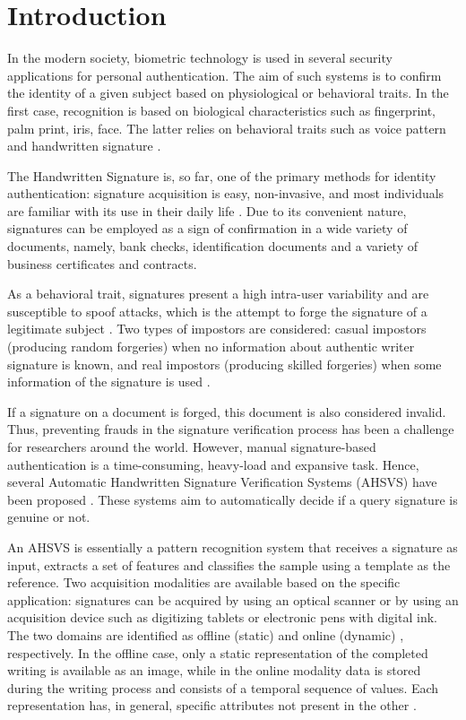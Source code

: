 
\chapter{Introduction}

In the modern society, biometric technology is used in several security applications for personal authentication. The aim of such systems is to confirm the identity of a given subject based on physiological or behavioral traits. In the first case, recognition is based on biological characteristics such as fingerprint, palm print, iris, face. The latter relies on behavioral traits such as voice pattern and handwritten signature \cite{jain2004biometrics}.

The Handwritten Signature is, so far, one of the primary methods for identity authentication: signature acquisition is easy, non-invasive, and most individuals are familiar with its use in their daily life \cite{impedovo2008state}. Due to its convenient nature, signatures can be employed as a sign of confirmation in a wide variety of documents, namely, bank checks, identification documents and a variety of business certificates and contracts.

As a behavioral trait, signatures present a high intra-user variability and are susceptible to spoof attacks, which is the attempt to forge the signature of a legitimate subject \cite{jain2004biometrics}. Two types of impostors are considered: casual impostors (producing random forgeries) when no information about authentic writer signature is known, and real impostors (producing skilled forgeries) when some information of the signature is used \cite{fierrez2008handbook}.


If a signature on a document is forged, this document is also considered invalid. Thus, preventing frauds in the signature verification process has been a challenge for researchers around the world. However, manual signature-based authentication is a time-consuming, heavy-load and expansive task. Hence, several Automatic Handwritten Signature Verification Systems (AHSVS) have been proposed \cite{impedovo2008state}. These systems aim to automatically decide if a query signature is genuine or not.

An AHSVS is essentially a pattern recognition system that receives a signature as input, extracts a set of features and classifies the sample using a template as the reference. Two acquisition modalities are available based on the specific application: signatures can be acquired by using an optical scanner or by using an acquisition device such as digitizing tablets or electronic pens with digital ink. The two domains are identified as offline (static) \cite{hafemann2015offline} and online (dynamic) \cite{cpalka2014line}, respectively. In the offline case, only a static representation of the completed writing is available as an image, while in the online modality data is stored during the writing process and consists of a temporal sequence of values. Each representation has, in general, specific attributes not present in the other \cite{viard1999ireste}.

